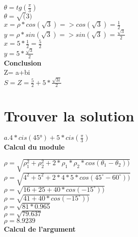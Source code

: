 \vspace{3mm} %
$\theta = tg(\frac{\pi}{3})$\\
$\theta = \sqrt(3)$\\

$x= \rho * cos(\sqrt{3}) => cos(\sqrt{3}) = \frac{1}{2}$ \\
$y= \rho * sin(\sqrt{3}) => sin(\sqrt{3}) = \frac{\sqrt{3}}{2}$ \\

$x= 5*\frac{1}{2} = \frac{5}{2}$ \\
$y= 5*\frac{\sqrt{3}}{2}$ \\

\textbf{Conclusion} \\

Z= a+bi \\

$ S= Z=\frac{5}{2} + 5*\frac{\sqrt{3i}} {2}$

\newpage

\vspace{3mm} %
\section{Trouver la solution}
\vspace{3mm} %

$a. 4*cis(45°) + 5*cis(\frac{\pi}{3})$\\

\textbf{Calcul du module} \\
\vspace{3mm} %

$\rho = \sqrt{\rho_1^{2}+\rho_2^{2} + 2 * \rho_1 * \rho_2 * cos(\theta_1-\theta_2))}$ \\

$\rho = \sqrt{4^{2}+5^{2} + 2*4*5 * cos(45^{\circ}-60^{\circ}))}$ \\

$\rho = \sqrt{16+25 + 40 * cos(-15^{\circ}))}$ \\

$\rho = \sqrt{41 + 40 * cos(-15^{\circ}))}$ \\

$\rho = \sqrt{81 * 0.965}$ \\

$\rho = \sqrt{79.637}$ \\

$\rho = 8.9239 $ \\

\textbf{Calcul de l'argument} \\
\vspace{3mm} %

